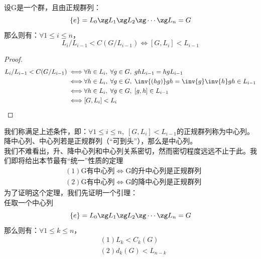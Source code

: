 \\
设G是一个群，且由正规群列：
\[
\{e\}=L_0\zg L_1\zg L_2\zg \cdots \zg L_n=G
\]
那么则有：$\forall 1\leq i\leq n$，
\[
L_i/L_{i-1}<C(G/L_{i-1})\iff [G,L_i]<L_{i-1}
\]
\begin{proof}
\[
\begin{aligned}
L_i/L_{i-1}<C(G/L_{i-1})\iff & \forall h\in L_i,\; \forall g\in G,\; ghL_{i-1}=hgL_{i-1}\\
\iff &\forall h\in L_i,\; \forall g\in G,\; \inv{(hg)}gh=\inv{g}\inv{h}gh\in L_{i-1}\\
\iff &\forall h\in L_i,\; \forall g\in G,\; [g,h]\in L_{i-1}\\
\iff &[G,L_i]<L_i
\end{aligned}
\]
\end{proof}
我们称满足上述条件，即：$\forall 1\leq i\leq n,\; [G,L_i]<L_{i-1}$的正规群列称为中心列。\\
降中心列、中心列若是正规群列（“可到头”），那么是中心列。\\
\indent 我们不难看出，升、降中心列和中心列关系密切，然而密切程度远远不止于此。我们即将给出本节最有“统一”性质的定理\\
\[
\begin{aligned}
&(1)\text{G有中心列}\iff \text{G的升中心列是正规群列}\\
&(2)\text{G有中心列}\iff \text{G的降中心列是正规群列}
\end{aligned}
\]
为了证明这个定理，我们先证明一个引理：\\
任取一个中心列
\[
\{e\}=L_0\zg L_1\zg L_2\zg \cdots \zg L_n=G
\]
那么则有：$\forall 1\leq k\leq n$，
\[
\begin{aligned}
&(1)L_k<C_k(G)\\
&(2)d_k(G)<L_{n-k}
\end{aligned}
\]

